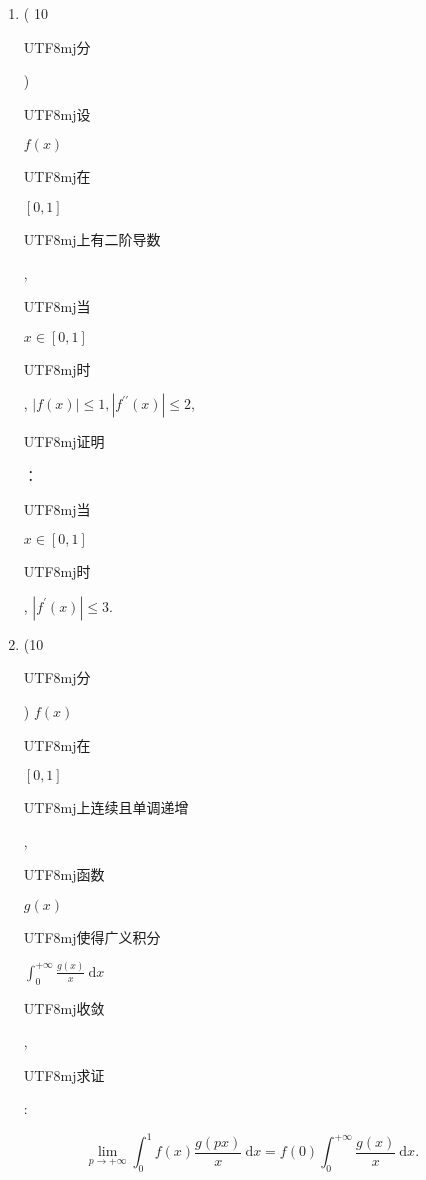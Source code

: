 \documentclass[10pt]{article}
\begin{document}
\begin{enumerate}
  \item ( 10 \begin{CJK}{UTF8}{mj}分\end{CJK}) \begin{CJK}{UTF8}{mj}设\end{CJK} $f(x)$ \begin{CJK}{UTF8}{mj}在\end{CJK} $[0,1]$ \begin{CJK}{UTF8}{mj}上有二阶导数\end{CJK}, \begin{CJK}{UTF8}{mj}当\end{CJK} $x \in[0,1]$ \begin{CJK}{UTF8}{mj}时\end{CJK}, $|f(x)| \leqslant 1,\left|f^{\prime \prime}(x)\right| \leqslant 2$, \begin{CJK}{UTF8}{mj}证明\end{CJK}：\begin{CJK}{UTF8}{mj}当\end{CJK} $x \in[0,1]$ \begin{CJK}{UTF8}{mj}时\end{CJK}, $\left|f^{\prime}(x)\right| \leqslant 3$.

  \item (10 \begin{CJK}{UTF8}{mj}分\end{CJK}) $f(x)$ \begin{CJK}{UTF8}{mj}在\end{CJK} $[0,1]$ \begin{CJK}{UTF8}{mj}上连续且单调递增\end{CJK}, \begin{CJK}{UTF8}{mj}函数\end{CJK} $g(x)$ \begin{CJK}{UTF8}{mj}使得广义积分\end{CJK} $\int_{0}^{+\infty} \frac{g(x)}{x} \mathrm{~d} x$ \begin{CJK}{UTF8}{mj}收敛\end{CJK}, \begin{CJK}{UTF8}{mj}求证\end{CJK}:

\end{enumerate}
$$
\lim _{p \rightarrow+\infty} \int_{0}^{1} f(x) \frac{g(p x)}{x} \mathrm{~d} x=f(0) \int_{0}^{+\infty} \frac{g(x)}{x} \mathrm{~d} x .
$$
\end{document}
